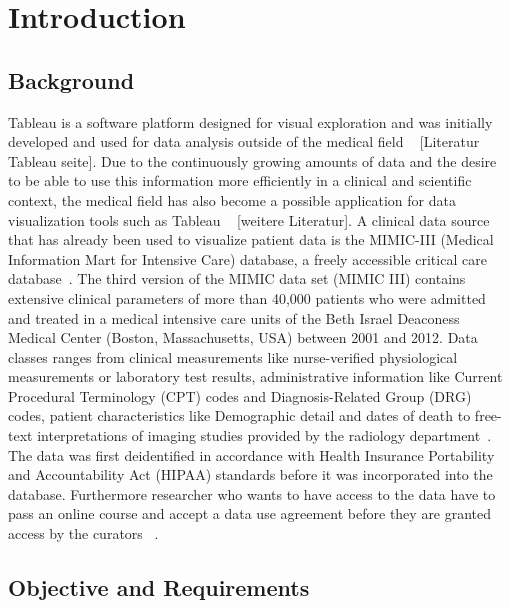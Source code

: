 \documentclass[aac]{iosart2x}
\begin{document}

\section{Introduction}\label{s1}

\subsection{Background}\label{s1.1}
\noindent Tableau is a software platform designed for visual exploration and was initially developed and used for
data analysis outside of the medical field ~\cite{Ko.2017} [Literatur Tableau seite]. Due to the continuously growing
amounts of data and the desire to be able to use this information more efficiently in a clinical and
scientific context, the medical field has also become a possible application for data visualization tools
such as Tableau ~\cite{Ko.2017} [weitere Literatur]. A clinical data source that has already been used to visualize patient data is the MIMIC-III (Medical Information Mart for Intensive Care) database, a freely accessible critical care database~\cite{Festag.2019,Lee.2016,Johnson.2020,Johnson.2016}. The third version of the MIMIC data set (MIMIC III) contains extensive clinical parameters of more than 40,000 patients who were admitted and treated in a medical intensive care units of the Beth Israel Deaconess Medical Center (Boston, Massachusetts, USA) between 2001 and 2012. Data classes ranges from clinical measurements like nurse-verified physiological measurements or laboratory test results, administrative
information like Current Procedural Terminology (CPT) codes and Diagnosis-Related Group (DRG) codes, patient characteristics like Demographic detail and dates of death to free-text interpretations of imaging studies provided by the radiology department~\cite{Johnson.2020,Johnson.2016}. The data was first deidentified in accordance with Health Insurance Portability and Accountability Act (HIPAA) standards before it was incorporated into the database. Furthermore researcher who wants to have access to the data have to pass an online course and accept a data use agreement before they are granted access by the curators ~\cite{Johnson.2020,Johnson.2016}.


\subsection{Objective and Requirements}\label{s1.2}
\end{document}
